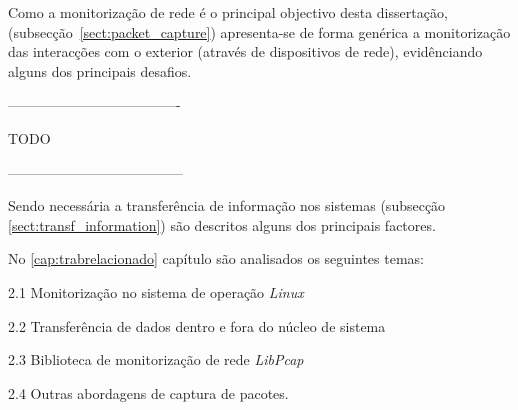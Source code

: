 Como a monitorização de rede é o principal objectivo desta dissertação, (subsecção~\ref{sect:packet_capture}) apresenta-se de forma genérica a monitorização das interacções com o exterior (através de dispositivos de rede), evidênciando alguns dos principais desafios.

-------------------------------------

TODO

--------------------------------------

Sendo necessária a transferência de informação nos sistemas (subsecção \ref{sect:transf_information}) são descritos alguns dos principais factores.

No \ref{cap:trabrelacionado} capítulo são analisados os seguintes temas:
\begin{description}

\item 2.1 Monitorização no sistema de operação \textit{Linux}

\item 2.2 Transferência de dados dentro e fora do núcleo de sistema

\item 2.3 Biblioteca de monitorização de rede \textit{LibPcap}

\item 2.4 Outras abordagens de captura de pacotes.
\end{description}

